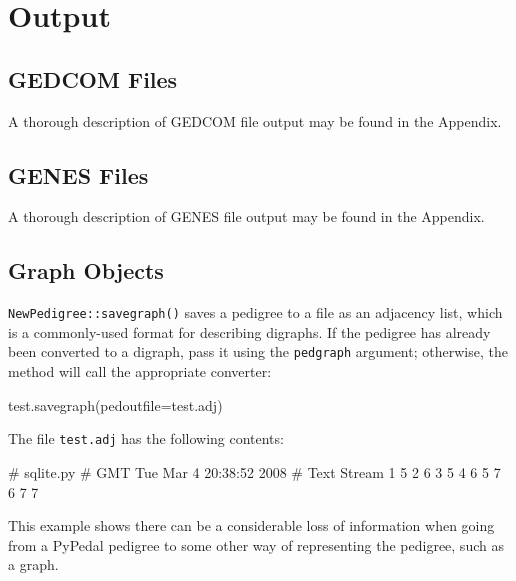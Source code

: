 \documentclass[
  letterpaper,
  DIV=11,
  numbers=noendperiod]{scrreprt}
\newenvironment{Shaded}{\begin{snugshade}}{\end{snugshade}}
\newcommand{\CommentTok}[1]{\textcolor[rgb]{0.37,0.37,0.37}{#1}}
\newcommand{\DecValTok}[1]{\textcolor[rgb]{0.68,0.00,0.00}{#1}}
\newcommand{\NormalTok}[1]{\textcolor[rgb]{0.00,0.23,0.31}{#1}}
\newcommand{\OperatorTok}[1]{\textcolor[rgb]{0.37,0.37,0.37}{#1}}
\newcommand{\StringTok}[1]{\textcolor[rgb]{0.13,0.47,0.30}{#1}}
\begin{document}
\section{Output}\label{output}

\subsection{GEDCOM Files}\label{gedcom-files}

A thorough description of GEDCOM file output may be found in the
Appendix.

\subsection{GENES Files}\label{genes-files}

A thorough description of GENES file output may be found in the
Appendix.

\subsection{Graph Objects}\label{graph-objects-1}

\texttt{NewPedigree::savegraph()} saves a pedigree to a file as an
adjacency list, which is a commonly-used format for describing digraphs.
If the pedigree has already been converted to a digraph, pass it using
the \texttt{pedgraph} argument; otherwise, the method will call the
appropriate converter:

\begin{Shaded}
\begin{Highlighting}[]
\NormalTok{test.savegraph(pedoutfile}\OperatorTok{=}\StringTok{\textquotesingle{}test.adj\textquotesingle{}}\NormalTok{)}
\end{Highlighting}
\end{Shaded}

The file \texttt{test.adj} has the following contents:

\begin{Shaded}
\begin{Highlighting}[]
\CommentTok{\# sqlite.py}
\CommentTok{\# GMT Tue Mar  4 20:38:52 2008}
\CommentTok{\# Text Stream}
\DecValTok{1} \DecValTok{5}
\DecValTok{2} \DecValTok{6}
\DecValTok{3} \DecValTok{5}
\DecValTok{4} \DecValTok{6}
\DecValTok{5} \DecValTok{7}
\DecValTok{6} \DecValTok{7}
\DecValTok{7}
\end{Highlighting}
\end{Shaded}

This example shows there can be a considerable loss of information when
going from a PyPedal pedigree to some other way of representing the
pedigree, such as a graph.
\end{document}
